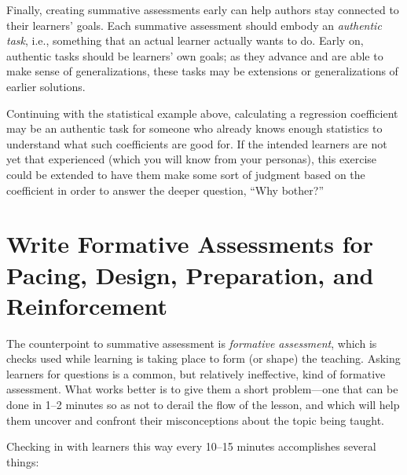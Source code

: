 \documentclass[10pt,letterpaper]{article}
\newcommand{\rulemajor}[1]{\section{#1}}
\begin{document}
Finally, creating summative assessments early can help authors stay connected to
their learners' goals.  Each summative assessment should embody an
\emph{authentic task}, i.e., something that an actual learner actually wants to
do.  Early on, authentic tasks should be learners' own goals; as they advance
and are able to make sense of generalizations, these tasks may be extensions or
generalizations of earlier solutions.

Continuing with the statistical example above, calculating a regression
coefficient may be an authentic task for someone who already knows enough
statistics to understand what such coefficients are good for.  If the intended
learners are not yet that experienced (which you will know from your personas),
this exercise could be extended to have them make some sort of judgment based
on the coefficient in order to answer the deeper question, ``Why bother?''

\rulemajor{Write Formative Assessments for Pacing, Design, Preparation, and Reinforcement}

The counterpoint to summative assessment is \emph{formative assessment}, which
is checks used while learning is taking place to form (or shape) the teaching.
Asking learners for questions is a common, but relatively ineffective, kind of
formative assessment.  What works better is to give them a short problem---one
that can be done in 1--2 minutes so as not to derail the flow of the lesson, and
which will help them uncover and confront their misconceptions about the topic
being taught.

Checking in with learners this way every 10--15 minutes accomplishes several
things:
\end{document}
